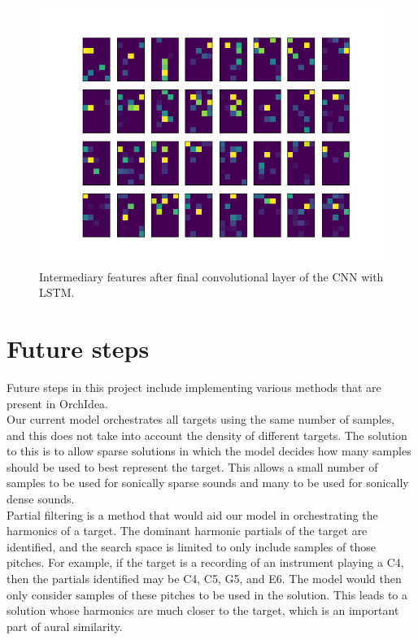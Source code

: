 \documentclass{article}
\begin{document}
\begin{figure}
\includegraphics[scale=0.5]{figs/latent_space_layer5.png}
\caption{Intermediary features after final convolutional layer of the CNN with LSTM. \label{latent5}}
\end{figure}

\section{Future steps}

Future steps in this project include implementing various methods that are present in OrchIdea.\\

Our current model orchestrates all targets using the same number of samples, and this does not take into account the density of different targets. The solution to this is to allow sparse solutions in which the model decides how many samples should be used to best represent the target. This allows a small number of samples to be used for sonically sparse sounds and many to be used for sonically dense sounds.\\

Partial filtering is a method that would aid our model in orchestrating the harmonics of a target. The dominant harmonic partials of the target are identified, and the search space is limited to only include samples of those pitches. For example, if the target is a recording of an instrument playing a C4, then the partials identified may be C4, C5, G5, and E6. The model would then only consider samples of these pitches to be used in the solution. This leads to a solution whose harmonics are much closer to the target, which is an important part of aural similarity.
\end{document}
